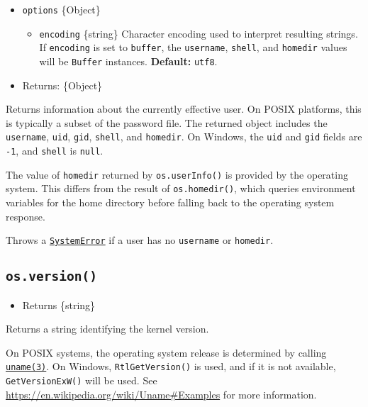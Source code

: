\begin{itemize}
\tightlist
\item
  \texttt{options} \{Object\}

  \begin{itemize}
  \tightlist
  \item
    \texttt{encoding} \{string\} Character encoding used to interpret
    resulting strings. If \texttt{encoding} is set to
    \texttt{\textquotesingle{}buffer\textquotesingle{}}, the
    \texttt{username}, \texttt{shell}, and \texttt{homedir} values will
    be \texttt{Buffer} instances. \textbf{Default:}
    \texttt{\textquotesingle{}utf8\textquotesingle{}}.
  \end{itemize}
\item
  Returns: \{Object\}
\end{itemize}

Returns information about the currently effective user. On POSIX
platforms, this is typically a subset of the password file. The returned
object includes the \texttt{username}, \texttt{uid}, \texttt{gid},
\texttt{shell}, and \texttt{homedir}. On Windows, the \texttt{uid} and
\texttt{gid} fields are \texttt{-1}, and \texttt{shell} is
\texttt{null}.

The value of \texttt{homedir} returned by \texttt{os.userInfo()} is
provided by the operating system. This differs from the result of
\texttt{os.homedir()}, which queries environment variables for the home
directory before falling back to the operating system response.

Throws a \href{errors.md\#class-systemerror}{\texttt{SystemError}} if a
user has no \texttt{username} or \texttt{homedir}.

\subsection{\texorpdfstring{\texttt{os.version()}}{os.version()}}\label{os.version}

\begin{itemize}
\tightlist
\item
  Returns \{string\}
\end{itemize}

Returns a string identifying the kernel version.

On POSIX systems, the operating system release is determined by calling
\href{https://linux.die.net/man/3/uname}{\texttt{uname(3)}}. On Windows,
\texttt{RtlGetVersion()} is used, and if it is not available,
\texttt{GetVersionExW()} will be used. See
\url{https://en.wikipedia.org/wiki/Uname\#Examples} for more
information.

